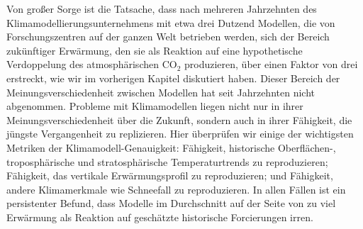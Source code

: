 \documentclass[12pt,paper=a4,DIV=12,parskip=never,chapterprefix=false,headings=standardclasses]{scrreprt}
\begin{document}
Von großer Sorge ist die Tatsache, dass nach mehreren Jahrzehnten des Klimamodellierungsunternehmens mit etwa drei Dutzend Modellen, die von Forschungszentren auf der ganzen Welt betrieben werden, sich der Bereich zukünftiger Erwärmung, den sie als Reaktion auf eine hypothetische Verdoppelung des atmosphärischen CO$_2$ produzieren, über einen Faktor von drei erstreckt, wie wir im vorherigen Kapitel diskutiert haben. Dieser Bereich der Meinungsverschiedenheit zwischen Modellen hat seit Jahrzehnten nicht abgenommen.
Probleme mit Klimamodellen liegen nicht nur in ihrer Meinungsverschiedenheit über die Zukunft, sondern auch in ihrer Fähigkeit, die jüngste Vergangenheit zu replizieren. Hier überprüfen wir einige der wichtigsten Metriken der Klimamodell-Genauigkeit: Fähigkeit, historische Oberflächen-, troposphärische und stratosphärische Temperaturtrends zu reproduzieren; Fähigkeit, das vertikale Erwärmungsprofil zu reproduzieren; und Fähigkeit, andere Klimamerkmale wie Schneefall zu reproduzieren. In allen Fällen ist ein persistenter Befund, dass Modelle im Durchschnitt auf der Seite von zu viel Erwärmung als Reaktion auf geschätzte historische Forcierungen irren.
\end{document}
